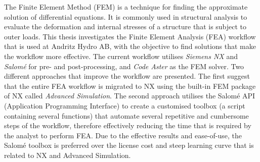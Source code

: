
The Finite Element Method (FEM) is a technique for finding the approximate solution of differential equations. It is commonly used in structural analysis to evaluate the deformation and internal stresses of a structure that is subject to outer loads. This thesis investigates the Finite Element Analysis (FEA) workflow that is used at Andritz Hydro AB, with the objective to find solutions that make the workflow more effective. The current workflow utilises \textit{Siemens NX} and \textit{Salomé} for pre- and post-processing, and \textit{Code Aster} as the FEM solver. Two different approaches that improve the workflow are presented. The first suggest that the entire FEA workflow is migrated to NX using the built-in FEM package of NX called \textit{Advanced Simulation}. The second approach utilises the Salomé API (Application Programming Interface) to create a customised toolbox (a script containing several functions) that automate several repetitive and cumbersome steps of the workflow, therefore effectively reducing the time that is required by the analyst to perform FEA. Due to the effective results and ease-of-use, the Salomé toolbox is preferred over the license cost and steep learning curve that is related to NX and Advanced Simulation. 
